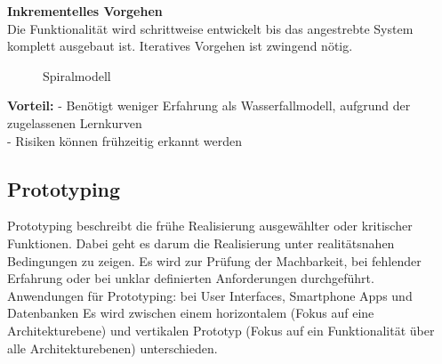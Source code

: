 \textbf{Inkrementelles Vorgehen} \\
Die Funktionalität wird schrittweise 
entwickelt bis das angestrebte System 
komplett ausgebaut ist. Iteratives Vorgehen ist zwingend nötig. 

\begin{figure}[ht]
	\centering
	\caption[]{Spiralmodell}
\end{figure}

\textbf{Vorteil:}
- Benötigt weniger Erfahrung als Wasserfallmodell, aufgrund der zugelassenen Lernkurven \\
- Risiken können frühzeitig erkannt werden

\subsection{Prototyping}
\begin{multicols}{2}
Prototyping beschreibt die frühe Realisierung ausgewählter oder kritischer Funktionen. Dabei geht es darum die Realisierung unter realitätsnahen Bedingungen zu zeigen. Es wird zur Prüfung der Machbarkeit, bei fehlender Erfahrung oder bei unklar definierten Anforderungen durchgeführt. \\
Anwendungen für Prototyping: bei User Interfaces, Smartphone Apps und Datenbanken
\columnbreak
Es wird zwischen einem horizontalem (Fokus auf eine Architekturebene) und vertikalen Prototyp (Fokus auf ein Funktionalität über alle Architekturebenen) unterschieden.

\end{multicols}

